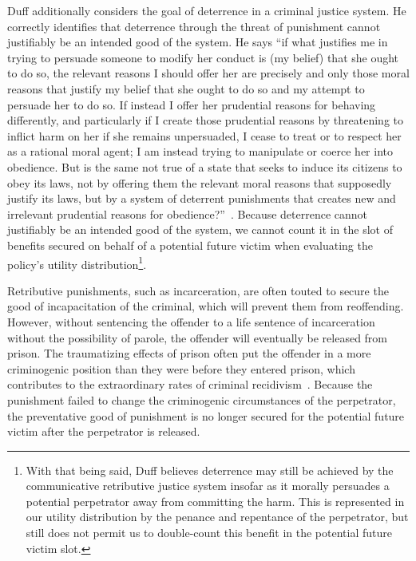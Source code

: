 \documentclass{article}
\begin{document}

        Duff additionally considers the goal of deterrence in a criminal justice system. He correctly identifies that deterrence through the threat of punishment cannot justifiably be an intended good of the system. He says ``if what justifies me in trying to persuade someone to modify her conduct is (my belief) that she ought to do so, the relevant reasons I should offer her are precisely and only those moral reasons that justify my belief that she ought to do so and my attempt to persuade her to do so. If instead I offer her prudential reasons for behaving differently, and particularly if I create those prudential reasons by threatening to inflict harm on her if she remains unpersuaded, I cease to treat or to respect her as a rational moral agent; I am instead trying to manipulate or coerce her into obedience. But is the same not true of a state that seeks to induce its citizens to obey its laws, not by offering them the relevant moral reasons that supposedly justify its laws, but by a system of deterrent punishments that creates new and irrelevant prudential reasons for obedience?''~\cite[p. 14]{communicative-retribution}. Because deterrence cannot justifiably be an intended good of the system, we cannot count it in the slot of benefits secured on behalf of a potential future victim when evaluating the policy's utility distribution\footnote{With that being said, Duff believes deterrence may still be achieved by the communicative retributive justice system insofar as it morally persuades a potential perpetrator away from committing the harm. This is represented in our utility distribution by the penance and repentance of the perpetrator, but still does not permit us to double-count this benefit in the potential future victim slot.}. 

        Retributive punishments, such as incarceration, are often touted to secure the good of incapacitation of the criminal, which will prevent them from reoffending. However, without sentencing the offender to a life sentence of incarceration without the possibility of parole, the offender will eventually be released from prison. The traumatizing effects of prison often put the offender in a more criminogenic position than they were before they entered prison, which contributes to the extraordinary rates of criminal recidivism~\cite{future-of-punishment}. Because the punishment failed to change the criminogenic circumstances of the perpetrator, the preventative good of punishment is no longer secured for the potential future victim after the perpetrator is released. 
\end{document}
